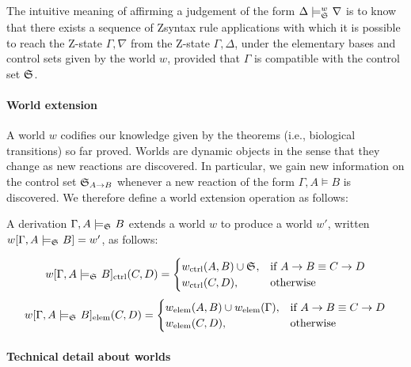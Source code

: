 The intuitive meaning of affirming a judgement of the form
$\Delta \models_{\mathfrak{S}_{}}^w \nabla$ is to know that there exists a sequence
of Zsyntax rule applications with which it is possible to reach the Z-state
$\Gamma, \nabla$ from the Z-state $\Gamma, \Delta$, under the elementary bases
and control sets given by the world $w$, provided that $\Gamma$ is compatible
with the control set $\mathfrak{S}_{}$.

\paragraph{World extension}

A world $w$ codifies our knowledge given by the theorems (i.e., biological
transitions) so far proved. Worlds are dynamic objects in the sense that they
change as new reactions are discovered. In particular, we gain new information
on the control set $\mathfrak{S}_{A \rightarrow B}$ whenever a new reaction of the
form $\Gamma, A \models B$ is discovered. We therefore define a world extension
operation as follows:

\begin{definition}
  A derivation $\Gamma, A \models_{\mathfrak{S}_{}} B$ extends a world $w$ to produce
  a world $w'$, written $w[\Gamma, A \models_{\mathfrak{S}_{}} B] = w'$, as follows:

  \[
    w[\Gamma, A \models_{\mathfrak{S}_{}} B]_{\text{ctrl}}(C,D) =
    \begin{cases}
      w_{\text{ctrl}}(A,B) \cup \mathfrak{S}_{}, & \text{if } A \rightarrow B \equiv
      C \rightarrow D \\
      w_{\text{ctrl}}(C,D), & \text{otherwise}
    \end{cases}
  \]
  \[
    w[\Gamma, A \models_{\mathfrak{S}_{}} B]_{\text{elem}}(C,D) =
    \begin{cases}
      w_{\text{elem}}(A,B) \cup w_{\text{elem}}(\Gamma), & \text{if } A \rightarrow B \equiv
      C \rightarrow D \\
      w_{\text{elem}}(C,D), & \text{otherwise}
    \end{cases}
  \]
\end{definition}

\paragraph{Technical detail about worlds}

